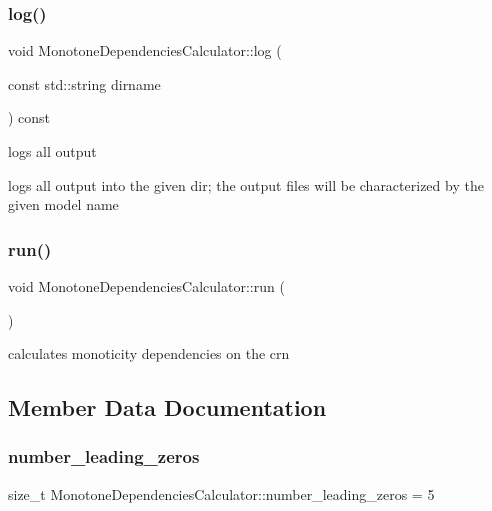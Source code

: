 \subsubsection{\texorpdfstring{log()}{log()}}
{\footnotesize\ttfamily void Monotone\+Dependencies\+Calculator\+::log (\begin{DoxyParamCaption}\item[{const std\+::string}]{dirname }\end{DoxyParamCaption}) const}



logs all output 

logs all output into the given dir; the output files will be characterized by the given model name \mbox{\label{classMonotoneDependenciesCalculator_addefd7e4a175dc984f466ab59f9827b6}} 
\subsubsection{\texorpdfstring{run()}{run()}}
{\footnotesize\ttfamily void Monotone\+Dependencies\+Calculator\+::run (\begin{DoxyParamCaption}{ }\end{DoxyParamCaption})}



calculates monoticity dependencies on the crn 



\subsection{Member Data Documentation}
\mbox{\label{classMonotoneDependenciesCalculator_ad44fd409a7a8d83d8c902cb2edb63ef6}} 
\subsubsection{\texorpdfstring{number\+\_\+leading\+\_\+zeros}{number\_leading\_zeros}}
{\footnotesize\ttfamily size\+\_\+t Monotone\+Dependencies\+Calculator\+::number\+\_\+leading\+\_\+zeros = 5}

